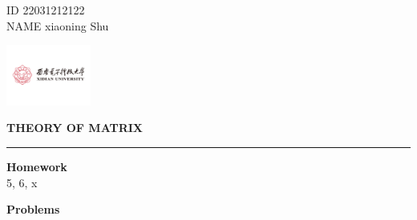 \documentclass[11pt,letterpaper]{ctexart}
\begin{document}
\pagestyle{plain}
\begin{flushleft}
ID 22031212122 \\
NAME xiaoning Shu\\
\end{flushleft}

\begin{flushright}\vspace{-18mm}
\includegraphics[height=2.0cm]{logo.png}
\end{flushright}
 
\begin{center}\vspace{-0.1cm}
\textbf{ \large THEORY OF MATRIX}\\
\end{center}

 
\rule{\linewidth}{0.1mm}

\bigskip
\textbf{\large{Homework}}
\\

{5, 6, x}



\bigskip
\textbf{\large{Problems}}
\end{document}
